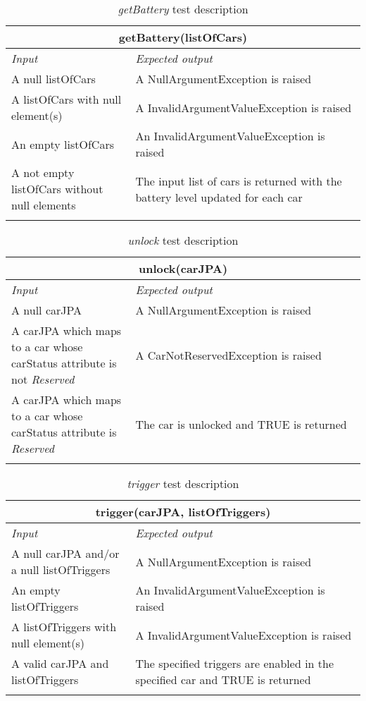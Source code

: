 \begin{longtable}{p{0.35\linewidth}p{0.65\linewidth}}
\multicolumn{2}{c}{\textbf{getBattery(listOfCars)}} \\
\toprule
\emph{Input} & \emph{Expected output} \\
\midrule
A null listOfCars & A NullArgumentException is raised\\
\midrule
A listOfCars with null element(s) & A InvalidArgumentValueException is raised\\
\midrule
An empty listOfCars & An InvalidArgumentValueException is raised \\
\midrule
A not empty listOfCars without null elements & The input list of cars is returned with the battery level updated for each car\\
\bottomrule
\caption{\emph{getBattery} test description}
\end{longtable}


\begin{longtable}{p{0.35\linewidth}p{0.65\linewidth}}
\multicolumn{2}{c}{\textbf{unlock(carJPA)}} \\
\toprule
\emph{Input} & \emph{Expected output} \\
\midrule
A null carJPA & A NullArgumentException is raised\\
\midrule
A carJPA which maps to a car whose carStatus attribute is not \emph{Reserved} & A CarNotReservedException is raised \\
\midrule
A carJPA which maps to a car whose carStatus attribute is \emph{Reserved} & The car is unlocked and TRUE is returned\\
\bottomrule
\caption{\label{tbl:unlock}\emph{unlock} test description}
\end{longtable}


\begin{longtable}{p{0.35\linewidth}p{0.65\linewidth}}
\multicolumn{2}{c}{\textbf{trigger(carJPA, listOfTriggers)}} \\
\toprule
\emph{Input} & \emph{Expected output} \\
\midrule
A null carJPA and/or a null listOfTriggers & A NullArgumentException is raised\\
\midrule
An empty listOfTriggers & An InvalidArgumentValueException is raised \\
\midrule
A listOfTriggers with null element(s) & A InvalidArgumentValueException is raised\\
\midrule
A valid carJPA and listOfTriggers & The specified triggers are enabled in the specified car and TRUE is returned\\
\bottomrule
\caption{\label{tbl:trigger}\emph{trigger} test description}
\end{longtable}

